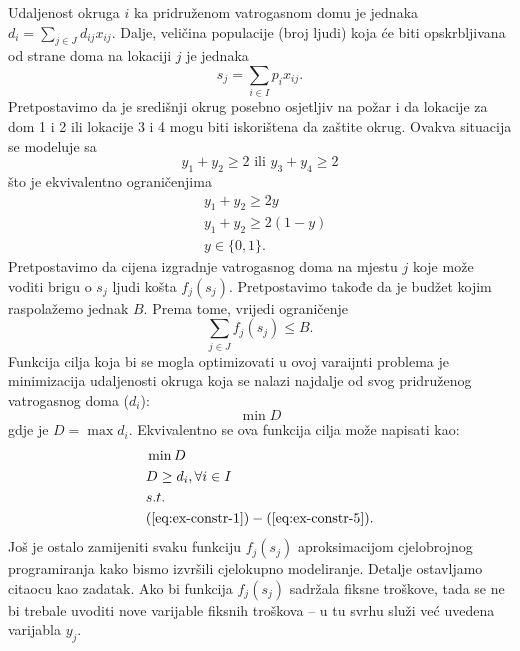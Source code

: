 \documentclass[a4paper, utf8, 11pt, colorlinks]{book}
\begin{document}
Udaljenost okruga $i$ ka pridruženom vatrogasnom domu je jednaka $d_i = \sum_{j \in J} d_{ij}x_{ij} $. Dalje, veličina populacije (broj ljudi) koja će biti opskrbljivana od strane doma na lokaciji $j$ je jednaka 
\begin{equation}\label{eq:ex-constr-3}
    s_j = \sum_{i \in I} p_i x_{ij}. 
\end{equation}
Pretpostavimo da je središnji okrug posebno osjetljiv na požar i da lokacije za dom  1 i 2 ili lokacije 3 i 4 mogu biti iskorištena da zaštite okrug. Ovakva situacija se modeluje sa
\begin{equation*} 
    y_1 + y_2 \geq 2 \mbox{ ili } y_3 + y_4 \geq 2
\end{equation*}
što je ekvivalentno ograničenjima 
\begin{align}
    &y_1 + y_2 \geq 2 y \nonumber \\
    &y_1 + y_2 \geq 2 (1-y) \nonumber \\
    & y \in \{0, 1 \}.\label{eq:ex-constr-4}
\end{align}
Pretpostavimo da cijena izgradnje vatrogasnog doma na mjestu $j$ koje može voditi brigu o $s_j$ ljudi košta $f_j(s_j)$. Pretpostavimo takođe da je budžet kojim raspolažemo jednak $B$. Prema tome, vrijedi ograničenje
\begin{equation}\label{eq:ex-constr-5}
     \sum_{j \in J} f_j(s_j) \leq B.
\end{equation}
 Funkcija cilja koja bi se mogla optimizovati u ovoj varaijnti problema je minimizacija udaljenosti 
 okruga koja se nalazi najdalje od svog pridruženog vatrogasnog doma ($d_i$):
      $$\min D $$
 gdje je $D= \max d_i$. Ekvivalentno se ova funkcija cilja može napisati kao:
 \begin{align*}
      &\min D \\
      & D \geq d_i,  \forall i \in I \\
      &  {s.t. } \\ 
      &(\ref{eq:ex-constr-1})-(\ref{eq:ex-constr-5}).
 \end{align*}
 Još je ostalo zamijeniti svaku funkciju $f_j (s_j)$ aproksimacijom cjelobrojnog programiranja kako bismo izvršili cjelokupno modeliranje. Detalje ostavljamo citaocu kao zadatak. Ako bi funkcija $f_j (s_j)$ sadržala fiksne troškove, tada se ne bi trebale uvoditi nove varijable fiksnih troškova -- u tu svrhu služi već uvedena varijabla $y_j$. 
 
\end{document}
